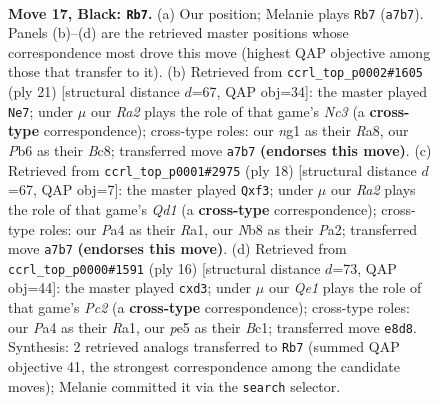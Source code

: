 \documentclass[11pt]{article}
\begin{document}
\clearpage

\begin{figure}[p]\centering
\begin{subfigure}{0.46\textwidth}\centering
\resizebox{\linewidth}{!}{%
\newchessgame
\chessboard[
  setfen={1nb1qrk1/r1p1nppp/1p2p3/1N1pP3/p2P1P2/8/PPP2KPP/R2Q1BNR b - - 1 17},
  showmover=false,
  pgfstyle=straightmove, color=movearrow, markmove={a7-b7}
]}
\caption{}
\end{subfigure}\hfill
\begin{subfigure}{0.46\textwidth}\centering
\resizebox{\linewidth}{!}{%
\newchessgame
\chessboard[
  setfen={r1bq1rk1/pp3pp1/2np1n1p/2pPp3/2P5/2PBP3/P2N1PPP/R1BQR1K1 b - - 0 11},
  showmover=false,
  pgfstyle=straightmove, color=movearrow, markmove={c6-e7}
]}
\caption{}
\end{subfigure}
\\[4pt]
\begin{subfigure}{0.46\textwidth}\centering
\resizebox{\linewidth}{!}{%
\newchessgame
\chessboard[
  setfen={r3kb1r/pp1qnppp/3pp3/2p5/2P1P3/2NPBn2/PP3PPP/R2Q1RK1 w kq - 0 10},
  showmover=false,
  pgfstyle=straightmove, color=movearrow, markmove={d1-f3}
]}
\caption{}
\end{subfigure}\hfill
\begin{subfigure}{0.46\textwidth}\centering
\resizebox{\linewidth}{!}{%
\newchessgame
\chessboard[
  setfen={rn1qk2r/p1p1nppp/1p2p3/3pP3/3P4/2Pb1N2/P1P2PPP/R1BQ1RK1 w kq - 0 9},
  showmover=false,
  pgfstyle=straightmove, color=movearrow, markmove={c2-d3}
]}
\caption{}
\end{subfigure}
\caption{\textbf{Move 17, Black: \texttt{Rb7}.} (a) Our position; Melanie plays \texttt{Rb7} (\texttt{a7b7}). Panels (b)--(d) are the retrieved master positions whose correspondence most drove this move (highest QAP objective among those that transfer to it). (b) Retrieved from \texttt{ccrl\_top\_p0002\#1605} (ply 21) [structural distance $d$=67, QAP obj=34]: the master played \texttt{Ne7}; under $\mu$ our \emph{Ra2} plays the role of that game's \emph{Nc3} (a \textbf{cross-type} correspondence); cross-type roles: our \emph{n}g1 as their \emph{R}a8, our \emph{P}b6 as their \emph{B}c8; transferred move \texttt{a7b7} \textbf{(endorses this move)}. (c) Retrieved from \texttt{ccrl\_top\_p0001\#2975} (ply 18) [structural distance $d$=67, QAP obj=7]: the master played \texttt{Qxf3}; under $\mu$ our \emph{Ra2} plays the role of that game's \emph{Qd1} (a \textbf{cross-type} correspondence); cross-type roles: our \emph{P}a4 as their \emph{R}a1, our \emph{N}b8 as their \emph{P}a2; transferred move \texttt{a7b7} \textbf{(endorses this move)}. (d) Retrieved from \texttt{ccrl\_top\_p0000\#1591} (ply 16) [structural distance $d$=73, QAP obj=44]: the master played \texttt{cxd3}; under $\mu$ our \emph{Qe1} plays the role of that game's \emph{Pc2} (a \textbf{cross-type} correspondence); cross-type roles: our \emph{P}a4 as their \emph{R}a1, our \emph{p}e5 as their \emph{B}c1; transferred move \texttt{e8d8}. Synthesis: 2 retrieved analogs transferred to \texttt{Rb7} (summed QAP objective 41, the strongest correspondence among the candidate moves); Melanie committed it via the \texttt{search} selector.}
\label{fig:thought-m33}
\end{figure}
\end{document}
